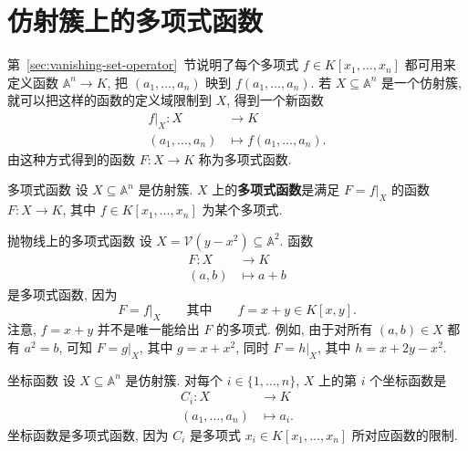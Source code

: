 \section{仿射簇上的多项式函数}\label{sec:polynomial-functions-on-affine-varieties}

第~\ref{sec:vanishing-set-operator}~节说明了每个多项式 $f\in K[x_{1},\ldots,x_{n}]$ 都可用来定义函数 $\mathbb{A}^{n}\to K$, 把 $(a_{1},\ldots,a_{n})$ 映到 $f(a_{1},\ldots,a_{n})$. 若 $X\subseteq\mathbb{A}^{n}$ 是一个仿射簇, 就可以把这样的函数的定义域限制到 $X$, 得到一个新函数
\[
  \begin{aligned}
    f|_{X}:X&\to K\\
    (a_{1},\ldots,a_{n})&\mapsto f(a_{1},\ldots,a_{n}).
  \end{aligned}
\]
由这种方式得到的函数 $F:X\to K$ 称为多项式函数.

\begin{Definition}{多项式函数}\leavevmode\label{def:polynomial-function-on-affine-variety}
  设 $X\subseteq\mathbb{A}^{n}$ 是仿射簇. $X$ 上的\textbf{多项式函数}是满足 $F=f|_{X}$ 的函数 $F:X\to K$, 其中 $f\in K[x_{1},\ldots,x_{n}]$ 为某个多项式.
\end{Definition}

\begin{Example}{抛物线上的多项式函数}\leavevmode\label{ex:polynomial-functions-on-parabola}
  设 $X=\mathcal{V}(y-x^{2})\subseteq\mathbb{A}^{2}$. 函数
  \[
    \begin{aligned}
      F:X&\to K\\
      (a,b)&\mapsto a+b
    \end{aligned}
  \]
  是多项式函数, 因为
  \[
    F=f|_{X}\qquad\text{其中}\qquad f=x+y\in K[x,y].
  \]
  注意, $f=x+y$ 并不是唯一能给出 $F$ 的多项式. 例如, 由于对所有 $(a,b)\in X$ 都有 $a^{2}=b$, 可知 $F=g|_{X}$, 其中 $g=x+x^{2}$, 同时 $F=h|_{X}$, 其中 $h=x+2y-x^{2}$.
\end{Example}

\begin{Example}{坐标函数}\leavevmode\label{ex:coordinate-functions}
  设 $X\subseteq\mathbb{A}^{n}$ 是仿射簇. 对每个 $i\in\{1,\ldots,n\}$, $X$ 上的第 $i$ 个坐标函数是
  \[
    \begin{aligned}
      C_{i}:X&\to K\\
      (a_{1},\ldots,a_{n})&\mapsto a_{i}.
    \end{aligned}
  \]
  坐标函数是多项式函数, 因为 $C_{i}$ 是多项式 $x_{i}\in K[x_{1},\ldots,x_{n}]$ 所对应函数的限制.
\end{Example}

